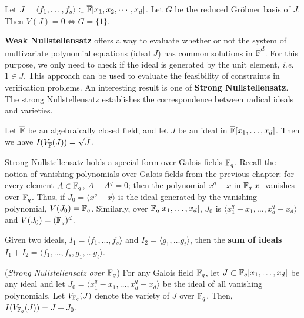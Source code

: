 \begin{Corollary}
	Let $J=\langle f_{1},\dots,f_{s} \rangle \subset \overline {{\mathbb{F}}}[x_1, x_2, \cdots, x_d]$. 
	Let $G$ be the reduced Gr\"obner basis of $J$. Then $V(J)=0 \iff G=\{1\}$.
\end{Corollary}

{\bf Weak Nullstellensatz} offers a way to evaluate whether or not the 
system of multivariate polynomial equations (ideal $J$) has common solutions 
in ${\overline {{\mathbb{F}}}}^d$. For this purpose, we only need to check if 
the ideal is generated by the unit element, {\it i.e.} $1\in J$. 
This approach can be used to evaluate the feasibility of constraints in 
verification problems.
An interesting result is one of {\bf Strong 
Nullstellensatz}.
The strong
Nullstellensatz establishes the correspondence between radical ideals
and varieties. 

\begin{Theorem}
\label{thm:sns}
\cite{gb_book} 
Let $\overline{{\mathbb{F}}}$ be an algebraically closed field, and let $J$
be an ideal in $\overline{{\mathbb{F}}}[x_1,\dots, x_d]$. 
Then we have $I(V_{\overline{{\mathbb{F}}}}(J)) =\sqrt{J}$. 
\end{Theorem}


Strong Nullstellensatz holds a special form over Galois fields ${\mathbb{F}}_{q}$.
Recall the notion of vanishing polynomials over Galois fields from the 
previous chapter: for every element $A \in {\mathbb{F}}_{q}$, $A-A^q = 0$; then the 
polynomial $x^q-x$ in ${\mathbb{F}}_{q}[x]$ vanishes over ${\mathbb{F}}_{q}$. Thus, if 
$J_0=\langle x^q-x \rangle$ is the ideal generated by the vanishing 
polynomial, $V(J_0)={\mathbb{F}}_{q}$. Similarly, over ${\mathbb{F}}_{q}[x_1,\dots,x_d]$, $J_0$ is 
$\langle x_1^q-x_1,\dots,x_d^q-x_d \rangle$ and $V(J_0)=({\mathbb{F}}_q)^d$.


\begin{Definition}
Given two ideals, $I_1=\langle f_1, \dots,f_s \rangle$ and 
$I_2=\langle g_1,\dots g_t\rangle$, then the {\bf sum of ideals} 
$I_1+I_2=\langle f_1,\dots,f_s,g_1,\dots g_t\rangle$.
\end{Definition}

\begin{Theorem}
({\it Strong Nullstellensatz over ${\mathbb{F}}_{q}$})
For any Galois field ${\mathbb{F}}_{q}$, let $J \subset {\mathbb{F}}_{q}[x_1,\dots,x_d]$ be any ideal 
and let $J_0 = \langle x_1^q-x_1,\dots, x_d^q-x_d \rangle$ be the ideal of all
vanishing polynomials. Let $V_{{\mathbb{F}}_{q}}(J)$ denote the variety of $J$ over ${\mathbb{F}}_{q}$.
Then, $I(V_{{\mathbb{F}}_{q}}(J))=J+J_0$.
\end{Theorem}

